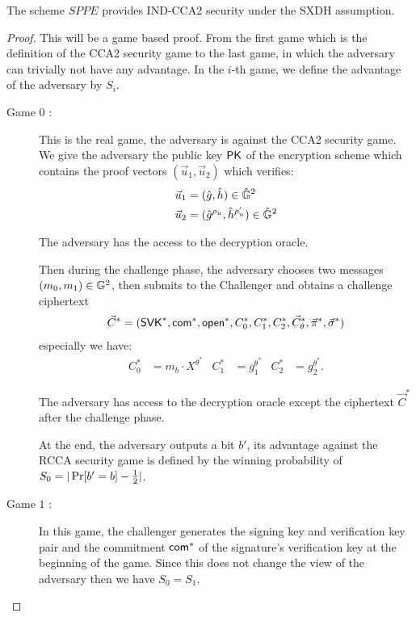 \begin{myTh}
  The scheme $SPPE$ provides IND-CCA2 security under the SXDH assumption.
\end{myTh}


\begin{proof}

  This will be a game based proof. From the first game which is the definition of the CCA2 security game to the last game, in which the adversary can trivially not have any advantage. In the $i$-th game, we define the advantage of the adversary by $S_i$.

  \begin{description}
  \item[\textsf{Game} $0$ :] This is the real game, the adversary is against the CCA2 security game. We give the adversary the public key $\mathsf{PK}$ of the encryption scheme which contains the proof vectors $(\vec{u}_1, \vec{u}_2)$ which verifies:
    \begin{align*}
      \vec{u}_1 &= (\hat{g}, \hat{h}) \in \hat{\mathbb{G}}^2\\
      \vec{u}_2 &= (\hat{g}^{\rho_u}, \hat{h}^{\rho_u'}) \in \hat{\mathbb{G}}^2
    \end{align*}

    The adversary has the access to the decryption oracle.
    
    Then during the challenge phase, the adversary chooses two messages $(m_0, m_1) \in \mathbb{G}^2$, then submits to the Challenger and obtains a challenge ciphertext
    \begin{align*}
      \vec{C}^* = (\mathsf{SVK}^*, \mathsf{com}^*, \mathsf{open}^*, C_0^*, C_1^*, C_2^*, \vec{C}_{\theta}^*, \vec{\pi}^*, \vec{\sigma}^*)
    \end{align*}
    especially we have:
    \begin{align*}
      C_0^* &= m_b \cdot X^{\theta^*} & C_1^* &= g_1^{\theta^*} & C_2^* &= g_2^{\theta^*}.
    \end{align*}

    The adversary has access to the decryption oracle except the ciphertext $\vec{C}^*$ after the challenge phase.

    At the end, the adversary outputs a bit $b'$, its advantage against the RCCA security game is defined by the winning probability of $S_0 = |\operatorname{Pr}[b' = b] - \frac{1}{2}|$.

  \item[\textsf{Game} $1$ :] In this game, the challenger generates the signing key and verification key pair and the commitment $\mathsf{com}^*$ of the signature's verification key at the beginning of the game. Since this does not change the view of the adversary then we have $S_0 = S_1$.


\end{description}
\end{proof}
